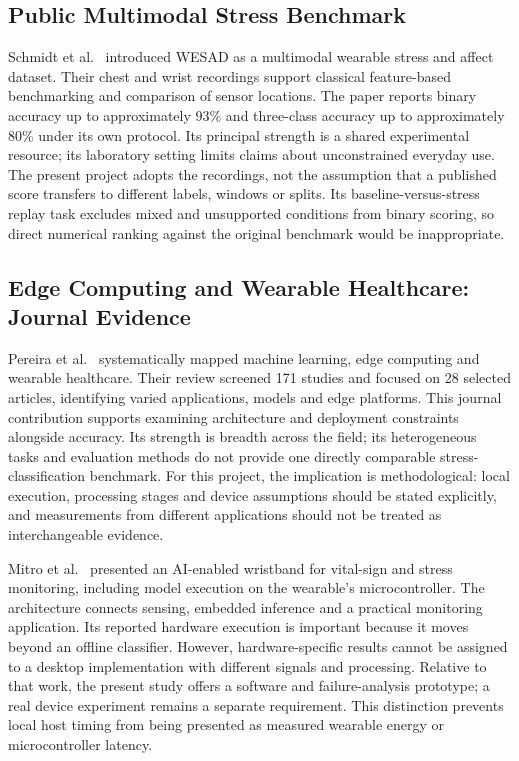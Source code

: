 \documentclass[conference,a4paper]{IEEEtran}
\newcommand{\pct}{\%}
\begin{document}
\subsection{Public Multimodal Stress Benchmark}
Schmidt et al.~\cite{schmidt2018} introduced WESAD as a multimodal wearable stress and affect dataset. Their chest and wrist recordings support classical feature-based benchmarking and comparison of sensor locations. The paper reports binary accuracy up to approximately 93\pct{} and three-class accuracy up to approximately 80\pct{} under its own protocol. Its principal strength is a shared experimental resource; its laboratory setting limits claims about unconstrained everyday use. The present project adopts the recordings, not the assumption that a published score transfers to different labels, windows or splits. Its baseline-versus-stress replay task excludes mixed and unsupported conditions from binary scoring, so direct numerical ranking against the original benchmark would be inappropriate.

\subsection{Edge Computing and Wearable Healthcare: Journal Evidence}
Pereira et al.~\cite{pereira2024} systematically mapped machine learning, edge computing and wearable healthcare. Their review screened 171 studies and focused on 28 selected articles, identifying varied applications, models and edge platforms. This journal contribution supports examining architecture and deployment constraints alongside accuracy. Its strength is breadth across the field; its heterogeneous tasks and evaluation methods do not provide one directly comparable stress-classification benchmark. For this project, the implication is methodological: local execution, processing stages and device assumptions should be stated explicitly, and measurements from different applications should not be treated as interchangeable evidence.

Mitro et al.~\cite{mitro2023} presented an AI-enabled wristband for vital-sign and stress monitoring, including model execution on the wearable's microcontroller. The architecture connects sensing, embedded inference and a practical monitoring application. Its reported hardware execution is important because it moves beyond an offline classifier. However, hardware-specific results cannot be assigned to a desktop implementation with different signals and processing. Relative to that work, the present study offers a software and failure-analysis prototype; a real device experiment remains a separate requirement. This distinction prevents local host timing from being presented as measured wearable energy or microcontroller latency.
\end{document}
